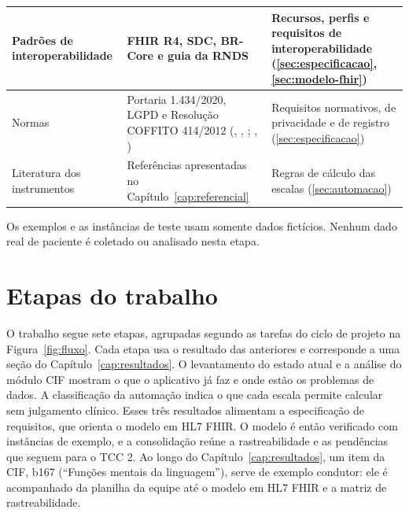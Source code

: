 \begin{quadro}[htb]
\begin{tabularx}{\textwidth}{|>{\raggedright\arraybackslash}p{}|>{\raggedright\arraybackslash}X|>{\raggedright\arraybackslash}p{}|}
		Padrões de interoperabilidade & FHIR R4, SDC, BR-Core e guia da RNDS
			\cite{rnds2026guia} & Recursos, perfis e requisitos de interoperabilidade
			(\ref{sec:especificacao}, \ref{sec:modelo-fhir}) \\ \hline
		Normas & Portaria 1.434/2020, LGPD e Resolução COFFITO 414/2012
			(\citeauthor{lgpd2018}, \citeyear{lgpd2018}, \citeyear{portaria1434:2020}; \citeauthor{coffito414:2012}, \citeyear{coffito414:2012}) & Requisitos normativos, de privacidade e de
			registro (\ref{sec:especificacao}) \\ \hline
		Literatura dos instrumentos & Referências apresentadas no Capítulo~\ref{cap:referencial} & Regras de
			cálculo das escalas (\ref{sec:automacao}) \\ \hline
	\end{tabularx}
\end{quadro}

Os exemplos e as instâncias de teste usam somente dados fictícios. Nenhum dado real de paciente é coletado ou
analisado nesta etapa.

\section{Etapas do trabalho}
\label{sec:etapas}

O trabalho segue sete etapas, agrupadas segundo as tarefas do ciclo de projeto na Figura~\ref{fig:fluxo}. Cada etapa
usa o resultado das anteriores e corresponde a uma seção do Capítulo~\ref{cap:resultados}. O levantamento do estado
atual e a análise do módulo CIF mostram o que o aplicativo já faz e onde estão os problemas de dados. A classificação
da automação indica o que cada escala permite calcular sem julgamento clínico. Esses três resultados alimentam a
especificação de requisitos, que orienta o modelo em HL7 FHIR. O modelo é então verificado com instâncias de exemplo,
e a consolidação reúne a rastreabilidade e as pendências que seguem para o TCC 2. Ao longo do
Capítulo~\ref{cap:resultados}, um item da CIF, b167 (``Funções mentais da linguagem''), serve de exemplo condutor:
ele é acompanhado da planilha da equipe até o modelo em HL7 FHIR e a matriz de rastreabilidade.

